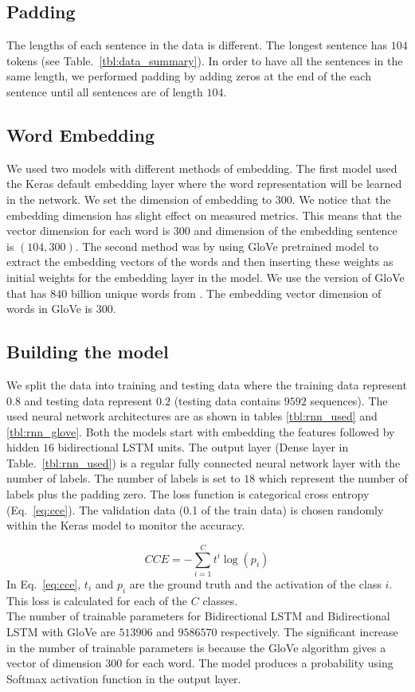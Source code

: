 \documentclass[sigconf, nonacm, natbib, screen, balance=False]{acmart}
\begin{document}
\subsection{Padding}
The lengths of each sentence in the data is different. The longest sentence has $104$ tokens (see Table.~\ref{tbl:data_summary}). In order to have all the sentences in the same length, we performed padding by adding zeros at the end of the each sentence until all sentences are of length $104$. 
\hfill\\
\subsection{Word Embedding}
We used two models with different methods of embedding. The first model used the Keras default embedding layer where the word representation will be learned in the network. We set the dimension of embedding to $300$. We notice that the embedding dimension has slight effect on measured metrics. This means that the vector dimension for each word is $300$ and dimension of the embedding sentence is $(104, 300)$. The second method was by using GloVe pretrained model to extract the embedding vectors of the words and then inserting these weights as initial weights for the embedding layer in the model. We use the version of GloVe that has $840$ billion unique words from \citet{glove840}. The embedding vector dimension of words in GloVe is $300$.
\hfill\\
\subsection{Building the model}
We split the data into training and testing data where the training data represent $0.8$ and testing data represent $0.2$ (testing data contains $9592$ sequences).
The used neural network architectures are as shown in tables \ref{tbl:rnn_used} and \ref{tbl:rnn_glove}. Both the models start with embedding the features followed by hidden $16$ bidirectional LSTM units. The output layer (Dense layer in Table.~\ref{tbl:rnn_used}) is a regular fully connected neural network layer with the number of labels. The number of labels is set to $18$ which represent the number of labels plus the padding zero. The loss function is categorical cross entropy (Eq.~\ref{eq:cce}). The validation data (0.1 of the train data) is chosen randomly within the Keras model to monitor the accuracy.

\begin{equation}
    CCE = - \sum_{i=1}^{C} t^{i} \log(p_{i})
    \label{eq:cce}
\end{equation} 
In Eq.~\ref{eq:cce}, $t_{i}$ and $p_{i}$ are the ground truth and the activation of the class $i$. This loss is calculated for each of the $C$ classes.
\hfill\\
The number of trainable parameters for Bidirectional LSTM and Bidirectional LSTM with GloVe are $513906$ and $9586570$ respectively. The significant increase in the number of trainable parameters is because the GloVe algorithm gives a vector of dimension $300$ for each word. The model produces a probability using Softmax activation function in the output layer.
\end{document}
